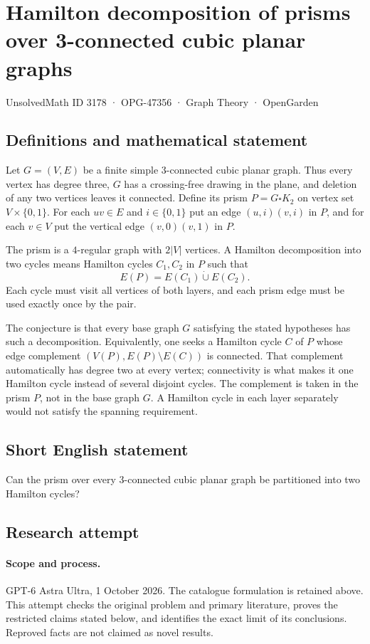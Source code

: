 \documentclass[11pt,a4paper]{article}
\begin{document}
\section*{Hamilton decomposition of prisms over 3-connected cubic planar graphs}\label{3178}
{\small UnsolvedMath ID 3178 · OPG-47356 · Graph Theory · OpenGarden}
\subsection{Definitions and mathematical statement}
Let $G=(V,E)$ be a finite simple $3$-connected cubic planar
graph. Thus every vertex has degree three, $G$ has a
crossing-free drawing in the plane, and deletion of any
two vertices leaves it connected. Define its prism
$P=G\square K_2$ on vertex set $V\times\{0,1\}$.
For each $uv\in E$ and $i\in\{0,1\}$ put an edge
$(u,i)(v,i)$ in $P$, and for each $v\in V$ put the
vertical edge $(v,0)(v,1)$ in $P$.

The prism is a $4$-regular graph with $2|V|$ vertices.
A Hamilton decomposition into two cycles means Hamilton
cycles $C_1,C_2$ in $P$ such that
\[
 E(P)=E(C_1)\mathbin{\dot\cup}E(C_2).
\]
Each cycle must visit all vertices of both layers, and
each prism edge must be used exactly once by the pair.

The conjecture is that every base graph $G$ satisfying
the stated hypotheses has such a decomposition. Equivalently,
one seeks a Hamilton cycle $C$ of $P$ whose edge complement
$(V(P),E(P)\setminus E(C))$ is connected. That complement
automatically has degree two at every vertex; connectivity
is what makes it one Hamilton cycle instead of several
disjoint cycles. The complement is taken in the prism $P$,
not in the base graph $G$. A Hamilton cycle in each layer
separately would not satisfy the spanning requirement.
\subsection{Short English statement}
Can the prism over every 3-connected cubic planar graph be partitioned into two Hamilton cycles?
\subsection{Research attempt}
\paragraph{Scope and process.}
GPT-6 Astra Ultra, 1 October 2026. The catalogue formulation is retained above. This attempt checks the original problem and primary literature, proves the restricted claims stated below, and identifies the exact limit of its conclusions. Reproved facts are not claimed as novel results.
\end{document}

